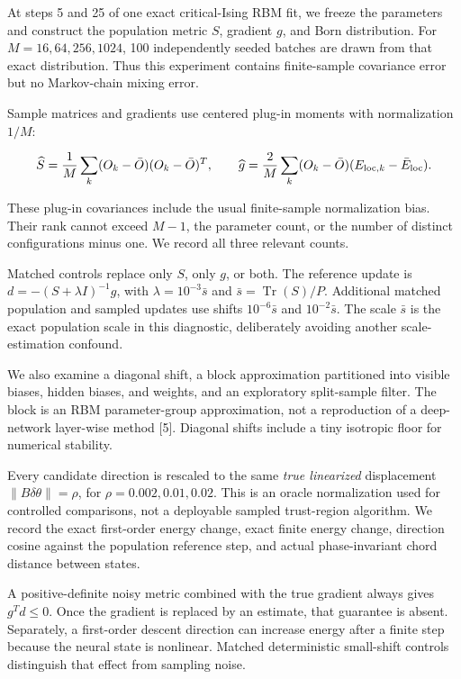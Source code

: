 \documentclass[
  11pt,
  a4paper,
]{article}
\begin{document}
At steps 5 and 25 of one exact critical-Ising RBM fit, we freeze the
parameters and construct the population metric \(S\), gradient \(g\),
and Born distribution. For \(M=16,64,256,1024\), 100 independently
seeded batches are drawn from that exact distribution. Thus this
experiment contains finite-sample covariance error but no Markov-chain
mixing error.

Sample matrices and gradients use centered plug-in moments with
normalization \(1/M\):

\[\widehat S=\frac1M\sum_k(O_k-\bar O)(O_k-\bar O)^T,\qquad
\widehat g=\frac2M\sum_k(O_k-\bar O)(E_{{\rm loc},k}-\bar E_{\rm loc}).\]

These plug-in covariances include the usual finite-sample normalization
bias. Their rank cannot exceed \(M-1\), the parameter count, or the
number of distinct configurations minus one. We record all three
relevant counts.

Matched controls replace only \(S\), only \(g\), or both. The reference
update is \(d=-(S+\lambda I)^{-1}g\), with \(\lambda=10^{-3}\bar s\) and
\(\bar s=\operatorname{Tr}(S)/P\). Additional matched population and
sampled updates use shifts \(10^{-6}\bar s\) and \(10^{-2}\bar s\). The
scale \(\bar s\) is the exact population scale in this diagnostic,
deliberately avoiding another scale-estimation confound.

We also examine a diagonal shift, a block approximation partitioned into
visible biases, hidden biases, and weights, and an exploratory
split-sample filter. The block is an RBM parameter-group approximation,
not a reproduction of a deep-network layer-wise method {[}5{]}. Diagonal
shifts include a tiny isotropic floor for numerical stability.

Every candidate direction is rescaled to the same \emph{true linearized}
displacement \(\|B\delta\theta\|=\rho\), for \(\rho=0.002,0.01,0.02\).
This is an oracle normalization used for controlled comparisons, not a
deployable sampled trust-region algorithm. We record the exact
first-order energy change, exact finite energy change, direction cosine
against the population reference step, and actual phase-invariant chord
distance between states.

A positive-definite noisy metric combined with the true gradient always
gives \(g^Td\le0\). Once the gradient is replaced by an estimate, that
guarantee is absent. Separately, a first-order descent direction can
increase energy after a finite step because the neural state is
nonlinear. Matched deterministic small-shift controls distinguish that
effect from sampling noise.
\end{document}
